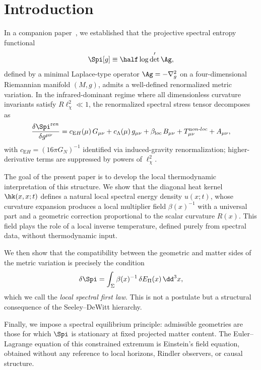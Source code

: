 \section{Introduction}
  \label{sec:intro}

  In a companion paper~\cite{Gravity20}, we established that the projective spectral
  entropy functional
  \begin{equation}
    \Spi[g] \equiv \half\log\det' \Ag ,
    \label{eq:Spi-def}
  \end{equation}
  defined by a minimal Laplace-type operator $\Ag = -\nabla_g^2$ on a four-dimensional
  Riemannian manifold $(M,g)$, admits a well-defined renormalized metric variation.
  In the infrared-dominant regime where all dimensionless curvature invariants satisfy
  $R\ell_\chi^2 \ll 1$, the renormalized spectral stress tensor decomposes as
  \begin{equation}
    \frac{\delta\Spi^{\mathrm ren}}{\delta g^{\mu\nu}}
    = c_{\mathrm EH}({\mu})\,G_{\mu\nu} + c_\Lambda(\mu)\,g_{\mu\nu}
    + \beta_{\mathrm loc}\,B_{\mu\nu} + T^{\mathrm non\text{-}loc}_{\mu\nu} + A_{\mu\nu},
    \label{eq:decomp-paper1}
  \end{equation}
  with $c_{\mathrm EH} = (16\pi G_N)^{-1}$ identified via induced-gravity renormalization;
  higher-derivative terms are suppressed by powers of $\ell_\chi^2$.

  The goal of the present paper is to develop the local thermodynamic interpretation
  of this structure.
  We show that the diagonal heat kernel $\hk(x,x;t)$ defines a natural local spectral
  energy density $u(x;t)$, whose curvature expansion produces a local multiplier field
  $\beta(x)^{-1}$ with a universal part and a geometric correction proportional to
  the scalar curvature $R(x)$.
  This field plays the role of a local inverse temperature, defined purely from spectral
  data, without thermodynamic input.

  We then show that the compatibility between the geometric and matter sides of the
  metric variation is precisely the condition
  \begin{equation}
    \delta\Spi = \int_\Sigma \beta(x)^{-1}\,\delta E_\Pi(x)\,\dd^3 x ,
    \label{eq:first-law-intro}
  \end{equation}
  which we call the \emph{local spectral first law}.
  This is not a postulate but a structural consequence of the Seeley--DeWitt
  hierarchy.

  Finally, we impose a spectral equilibrium principle: admissible geometries are
  those for which $\Spi$ is stationary at fixed projected matter content.
  The Euler--Lagrange equation of this constrained extremum is Einstein's field
  equation, obtained without any reference to local horizons, Rindler observers,
  or causal structure.

